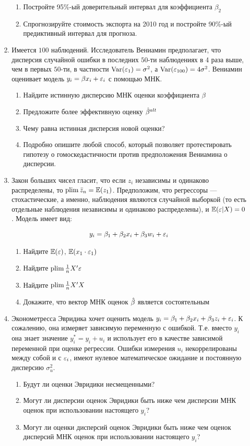 \documentclass[12pt, a4paper]{article}
\begin{document}
\begin{enumerate}
\begin{enumerate}
\item Постройте 95\%-ый доверительный интервал для коэффициента $\beta_2$
\item Спрогнозируйте стоимость экспорта на 2010 год и постройте 90\%-ый предиктивный интервал для прогноза.
\end{enumerate}
\item Имеется $100$ наблюдений. Исследователь Вениамин предполагает, что дисперсия случайной ошибки в последних $50$-ти наблюдениях в 4 раза выше, чем в первых $50$-ти, в частности $\operatorname{Var}(\varepsilon_1)=\sigma^2$, а $\operatorname{Var}(\varepsilon_{100})=4\sigma^2$. Вениамин оценивает модель $y_i=\beta x_i +\varepsilon_i$ с помощью МНК.
\begin{enumerate}
\item Найдите истинную дисперсию МНК оценки коэффициента $\beta$
\item Предложите более эффективную оценку $\hat{\beta}^{alt}$
\item Чему равна истинная дисперсия новой оценки?
\item Подробно опишите любой способ, который позволяет протестировать гипотезу о гомоскедастичности против предположения Вениамина о дисперсии.
\end{enumerate}

\item Закон больших чисел гласит, что если $z_i$ независимы и одинаково распределены, то $\operatorname*{plim} \bar{z}_n = \mathbb{E}(z_1)$. Предположим, что регрессоры — стохастические, а именно, наблюдения являются случайной выборкой (то есть отдельные наблюдения независимы и одинаково распределены), и  $\mathbb{E}(\varepsilon | X)=0$. Модель имеет вид:

\[
y_i=\beta_1 + \beta_2 x_i +\beta_3 w_i +\varepsilon_i
\]

\begin{enumerate}
\item Найдите $\mathbb{E}(\varepsilon)$, $\mathbb{E}(x_1 \cdot \varepsilon_1)$
\item Найдите $\operatorname*{plim} \frac{1}{n}X'\varepsilon$
\item Найдите $\operatorname*{plim} \frac{1}{n}X'X$
\item Докажите, что вектор МНК оценок $\hat{\beta}$ является состоятельным
\end{enumerate}


\item Эконометресса Эвридика хочет оценить модель $y_i=\beta_1 + \beta_2 x_i +\beta_3 z_i + \varepsilon_i$. К сожалению, она измеряет зависимую переменную с ошибкой. Т.е. вместо $y_i$ она знает значение $y_i^*=y_i+u_i$ и использует его в качестве зависимой переменной при оценке регрессии. Ошибки измерения $u_i$ некоррелированы между собой и с $\varepsilon_i$, имеют нулевое математическое ожидание и постоянную дисперсию $\sigma^2_u$.
\begin{enumerate}
\item Будут ли оценки Эвридики несмещенными?
\item Могут ли дисперсии оценок Эвридики быть ниже чем дисперсии МНК оценок при использовании настоящего $y_i$?
\item Могут ли оценки дисперсий оценок Эвридики быть ниже чем оценок дисперсий МНК оценок при использовании настоящего $y_i$?
\end{enumerate}



\end{enumerate}
\end{document}
